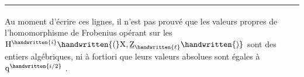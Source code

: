 \begin{minipage}{\linewidth}
\smallskip
\noindent\rule{0.32\linewidth}{0.4pt}\par
{\footnotesize\noindent\textsuperscript{}\quad Au moment d'écrire ces lignes, il n'est pas prouvé que les valeurs propres de l'homomorphisme de Frobenius opérant sur les $\mathrm{H}^{\handwritten{i}}\handwritten{(}\mathrm{X},\underline{\mathrm{Z}}_{\handwritten{\ell}}\handwritten{)}$ sont des entiers algébriques, ni à fortiori que leurs valeurs absolues sont égales à $\mathrm{q}^{\handwritten{i/2}}$ .\par}
\end{minipage}
